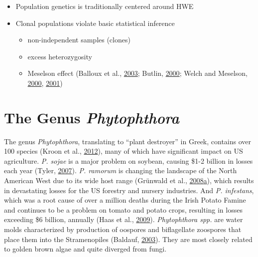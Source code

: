 \documentclass[double,12pt]{beavtex}
\providecommand{\tightlist}{%
  \setlength{\itemsep}{0pt}\setlength{\parskip}{0pt}}
\begin{document}
  \begin{itemize}
  \tightlist
  \item
    Population genetics is traditionally centered around HWE
  \item
    Clonal populations violate basic statistical inference
  
    \begin{itemize}
    \tightlist
    \item
      non-independent samples (clones)
    \item
      excess heterozygosity
    \item
      Meselson effect (Balloux et al.,
      \protect\hyperlink{ref-balloux2003population}{2003}; Butlin,
      \protect\hyperlink{ref-butlin2000virgin}{2000}; Welch and Meselson,
      \protect\hyperlink{ref-welch2000evidence}{2000},
      \protect\hyperlink{ref-welch2001rates}{2001})
    \end{itemize}
  \end{itemize}
  
  \section{\texorpdfstring{The Genus
  \emph{Phytophthora}}{The Genus Phytophthora}}\label{the-genus-phytophthora}
  
  The genus \emph{Phytophthora}, translating to ``plant destroyer'' in
  Greek, contains over 100 species (Kroon et al.,
  \protect\hyperlink{ref-kroon2012genus}{2012}), many of which have
  significant impact on US agriculture. \emph{P. sojae} is a major problem
  on soybean, causing \$1-2 billion in losses each year (Tyler,
  \protect\hyperlink{ref-tyler2007phytophthora}{2007}). \emph{P. ramorum}
  is changing the landscape of the North American West due to its wide
  host range (Grünwald et al.,
  \protect\hyperlink{ref-grunwald2008phytophthora}{2008}\protect\hyperlink{ref-grunwald2008phytophthora}{a}),
  which results in devastating losses for the US forestry and nursery
  industries. And \emph{P. infestans}, which was a root cause of over a
  million deaths during the Irish Potato Famine and continues to be a
  problem on tomato and potato crops, resulting in losses exceeding \$6
  billion, annually (Haas et al.,
  \protect\hyperlink{ref-haas2009genome}{2009}). \emph{Phytophthora spp.}
  are water molds characterized by production of oospores and biflagellate
  zoospores that place them into the Stramenopiles (Baldauf,
  \protect\hyperlink{ref-baldauf2003deep}{2003}). They are most closely
  related to golden brown algae and quite diverged from fungi.
  
\end{document}
